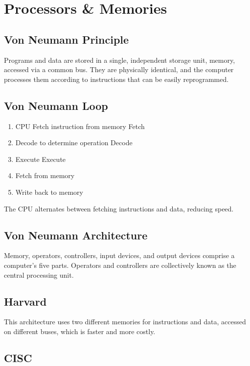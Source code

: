 \documentclass[11pt,journal,compsoc]{IEEEtran}
\begin{document}
\section{Processors \& Memories}


\subsection{Von Neumann Principle}

Programs and data are stored in a single, independent storage unit, memory, accessed via a common bus. They are physically identical, and the computer processes them according to instructions that can be easily reprogrammed.


\subsection{Von Neumann Loop}

\begin{enumerate}
    \item CPU Fetch instruction from memory Fetch
    \item Decode to determine operation Decode
    \item Execute Execute
    \item Fetch from memory
    \item Write back to memory
\end{enumerate}

The CPU alternates between fetching instructions and data, reducing speed.


\subsection{Von Neumann Architecture}

Memory, operators, controllers, input devices, and output devices comprise a computer's five parts. Operators and controllers are collectively known as the central processing unit.


\subsection{Harvard}

This architecture uses two different memories for instructions and data, accessed on different buses, which is faster and more costly.


\subsection{CISC}
\end{document}
